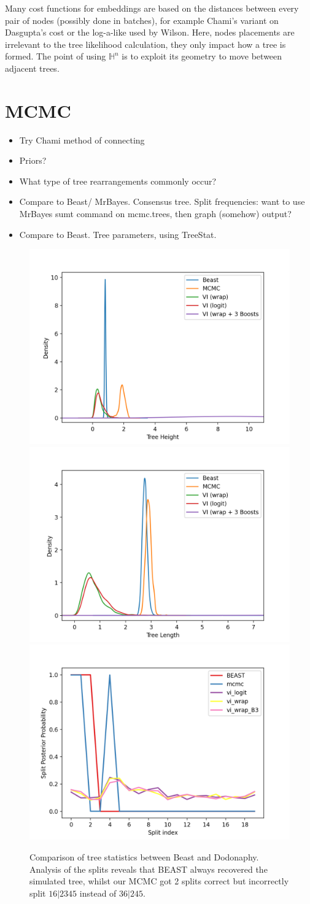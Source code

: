 \documentclass[11pt]{article}
\begin{document}
Many cost functions for embeddings are based on the distances between every pair of nodes (possibly done in batches), for example Chami's variant on Dasgupta's cost or the log-a-like used by Wilson. Here, nodes placements are irrelevant to the tree likelihood calculation, they only impact how a tree is formed. The point of using $\mathbb{H}^{n}$ is to exploit its geometry to move between adjacent trees.

\section{MCMC}

\begin{itemize}
\item Try Chami method of connecting
\item Priors?
\item What type of tree rearrangements commonly occur?
\item Compare to Beast/ MrBayes. Consensus tree. Split frequencies: want to use MrBayes sumt command on mcmc.trees, then graph (somehow) output?
\item Compare to Beast. Tree parameters, using TreeStat. 
\end{itemize}

\begin{figure}[htbp]
\begin{center}
\includegraphics[width=.333\linewidth]{fig/cmp_height}%
\includegraphics[width=.333\linewidth]{fig/cmp_length}%
\includegraphics[width=.333\linewidth]{fig/cmp_splits}
\caption{Comparison of tree statistics between Beast and Dodonaphy. Analysis of the splits reveals that BEAST always recovered the simulated tree, whilst our MCMC got 2 splits correct but incorrectly split $16|2345$ instead of $36|245$.}
\label{fig:stat_cmp}
\end{center}
\end{figure}
\end{document}
